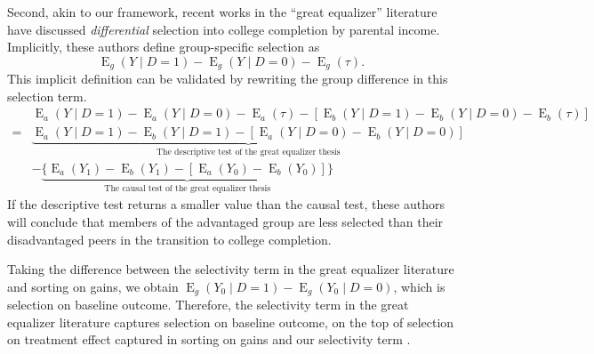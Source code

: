 \documentclass[12pt,a4paper]{article}
\newcommand{\E}{\operatorname{E}}
\begin{document}
Second, akin to our framework, recent works in the ``great equalizer'' literature  \citep{zhou_equalization_2019, fiel_great_2020, karlson_college_2019} have discussed \emph{differential} selection into college completion by parental income. Implicitly, these authors define group-specific selection as 
\begin{equation*}
    \E_g(Y \mid  D=1) - \E_g(Y \mid  D=0) - \E_g(\tau).
\end{equation*}
This implicit definition can be validated by rewriting the group difference in this selection term.
\begin{align*}
    \phantom{{}={}}& \E_a(Y \mid  D=1) - \E_a(Y  \mid  D=0) - \E_a(\tau) - [\E_b(Y \mid  D=1) - \E_b(Y  \mid  D=0) - \E_b(\tau)] \\
    =& \underbrace{\E_a(Y \mid  D=1)-\E_b(Y \mid  D=1) - [ \E_a(Y \mid  D=0)-\E_b(Y \mid  D=0)]}_{\text{The descriptive test of the great equalizer thesis}}  \\
    \phantom{{}={}}&- \underbrace{\lbrace \E_a(Y_1)-\E_b(Y_1) - [\E_a(Y_0)-\E_b(Y_0)] \rbrace}_{\text{The causal test of the great equalizer thesis}} 
\end{align*}
If the descriptive test returns a smaller value than the causal test, these authors will conclude that members of the advantaged group are less selected than their disadvantaged peers in the transition to college completion. 

Taking the difference between the selectivity term in the great equalizer literature and sorting on gains, we obtain $\E_g(Y_0 \mid  D=1)-\E_g(Y_0 \mid  D=0)$, which is selection on baseline outcome.
Therefore, the selectivity term in the great equalizer literature captures  selection on baseline outcome, on the top of selection on treatment effect captured in sorting on gains and our selectivity term \citep[See][p.58-9]{morgan_counterfactuals_2014}. 
\end{document}
